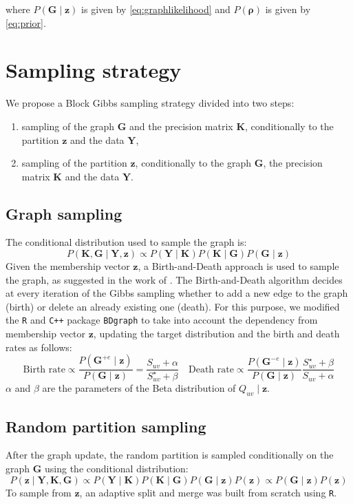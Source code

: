 where $P(\bm{G}\mid\bm{z})$ is given by \eqref{eq:graphlikelihood} and $P(\bm{\rho})$ is given by \eqref{eq:prior}.


\section{Sampling strategy}
We propose a Block Gibbs sampling strategy divided into two steps: 
\begin{enumerate}
    \item sampling of the graph $\bm{G}$ and the precision matrix $\bm{K}$, conditionally to the partition $\bm{z}$ and the data $\bm{Y}$,
    \item sampling of the partition $\bm{z}$, conditionally to the graph $\bm{G}$, the precision matrix $\bm{K}$ and the data $\bm{Y}$.
\end{enumerate}

\subsection{Graph sampling}
The conditional distribution used to sample the graph is:
\[
    P(\bm{K},\bm{G} \mid \bm{Y},\bm{z}) \propto P(\bm{Y} \mid \bm{K})P(\bm{K} \mid \bm{G}) P(\bm{G} \mid \bm{z})
\]
Given the membership vector $\bm{z}$, a Birth-and-Death approach is used to sample the graph, as suggested in the work of \textcite{mohammadiBayesianStructureLearning2015a}.
The Birth-and-Death algorithm decides at every iteration of the Gibbs sampling whether to add a new edge to the graph (birth) or delete an already existing one (death).
For this purpose, we modified the \texttt{R} and \texttt{C++} package \texttt{BDgraph} to take into account the dependency from membership vector $\bm{z}$, updating the target distribution and the birth and death rates as follows:
\[
\text{Birth rate} \propto \frac{P(\bm{G}^{+ e}\mid \bm{z})}{P(\bm{G}\mid \bm{z})} = \frac{S_{uv} + \alpha}{S^{\star}_{uv} + \beta}
\quad
\text{Death rate} \propto \frac{P(\bm{G}^{- e}\mid \bm{z})}{P(\bm{G}\mid \bm{z})} \frac{S^{\star}_{uv} + \beta}{S_{uv} + \alpha}
\]
$\alpha$ and $\beta$ are the parameters of the Beta distribution of $Q_{uv}\mid \bm{z}$.

\subsection{Random partition sampling}
After the graph update, the random partition is sampled conditionally on the graph $\bm{G}$ using the conditional distribution:
\begin{equation*}
    P(\bm{z} \mid \bm{Y},\bm{K},\bm{G}) \propto P(\bm{Y} \mid \bm{K})P(\bm{K} \mid \bm{G})P(\bm{G} \mid \bm{z})P(\bm{z}) \propto P(\bm{G} \mid \bm{z})P(\bm{z})
\end{equation*}
To sample from $\bm{z}$, an adaptive split and merge was built from scratch using \texttt{R}.

